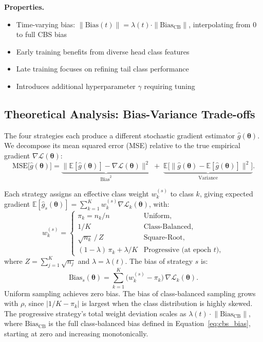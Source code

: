 \documentclass[12pt,a4paper]{article}
\newcommand{\btheta}{\boldsymbol{\theta}}
\begin{document}
\textbf{Properties.}
\begin{itemize}[leftmargin=*]
    \item Time-varying bias: $\|\mathrm{Bias}(t)\| = \lambda(t)\cdot\|\mathrm{Bias}_{\text{CB}}\|$, interpolating from $0$ to full CBS bias
    \item Early training benefits from diverse head class features
    \item Late training focuses on refining tail class performance
    \item Introduces additional hyperparameter $\gamma$ requiring tuning
\end{itemize}


\subsection{Theoretical Analysis: Bias-Variance Trade-offs}
\label{sec:bias_variance}

The four strategies each produce a different stochastic gradient estimator $\hat{g}(\btheta)$. We decompose its mean squared error (MSE) relative to the true empirical gradient $\nabla \mathcal{L}(\btheta)$:
\begin{equation}
    \mathrm{MSE}\bigl[\hat{g}(\btheta)\bigr]
    = \underbrace{\bigl\lVert \mathbb{E}[\hat{g}(\btheta)] - \nabla \mathcal{L}(\btheta) \bigr\rVert^2}_{\text{Bias}^2}
    \;+\; \underbrace{\mathbb{E}\bigl[\bigl\lVert \hat{g}(\btheta) - \mathbb{E}[\hat{g}(\btheta)] \bigr\rVert^2\bigr]}_{\text{Variance}}.
    \label{eq:mse_decomp}
\end{equation}

Each strategy assigns an effective class weight $w_k^{(s)}$ to class $k$, giving expected gradient $\mathbb{E}[\hat{g}_s(\btheta)] = \sum_{k=1}^{K} w_k^{(s)} \nabla \mathcal{L}_k(\btheta)$, with:
\begin{equation}
    w_k^{(s)} =
    \begin{cases}
        \pi_k = n_k / n & \text{Uniform}, \\[4pt]
        1/K & \text{Class-Balanced}, \\[4pt]
        \sqrt{n_k}\,/\,Z & \text{Square-Root}, \\[4pt]
        (1-\lambda)\,\pi_k + \lambda/K & \text{Progressive (at epoch } t\text{)},
    \end{cases}
    \label{eq:class_weights}
\end{equation}
where $Z = \sum_{j=1}^{K}\sqrt{n_j}$ and $\lambda = \lambda(t)$. The bias of strategy $s$ is:
\begin{equation}
    \mathrm{Bias}_s(\btheta) = \sum_{k=1}^{K} \bigl(w_k^{(s)} - \pi_k\bigr)\,\nabla \mathcal{L}_k(\btheta).
    \label{eq:general_bias}
\end{equation}
Uniform sampling achieves zero bias. The bias of class-balanced sampling grows with $\rho$, since $|1/K - \pi_k|$ is largest when the class distribution is highly skewed. The progressive strategy's total weight deviation scales as $\lambda(t)\cdot\lVert\mathrm{Bias}_{\text{CB}}\rVert$, where
$\mathrm{Bias}_{\text{CB}}$ is the full class-balanced bias defined
in Equation~\eqref{eq:cbs_bias}, starting at zero and increasing monotonically.
\end{document}
